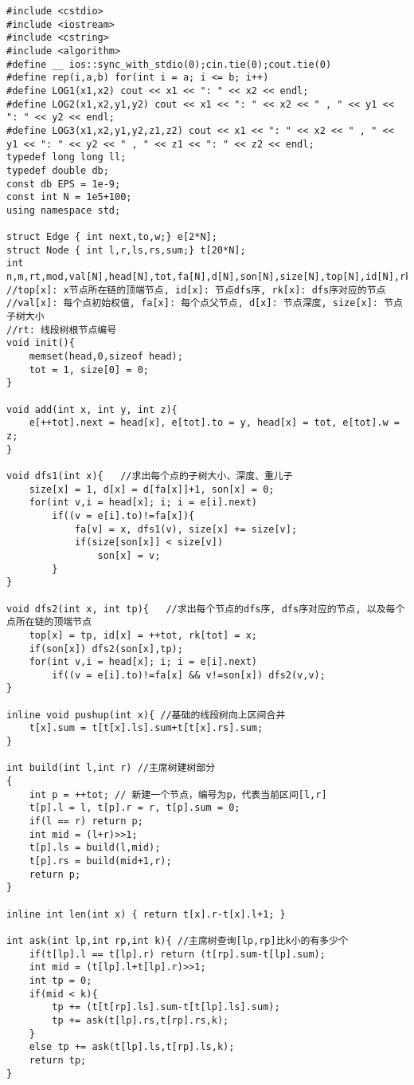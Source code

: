 \documentclass[twoside]{article}
\begin{document}
\begin{lstlisting}
#include <cstdio>
#include <iostream>
#include <cstring>
#include <algorithm>
#define __ ios::sync_with_stdio(0);cin.tie(0);cout.tie(0)
#define rep(i,a,b) for(int i = a; i <= b; i++)
#define LOG1(x1,x2) cout << x1 << ": " << x2 << endl;
#define LOG2(x1,x2,y1,y2) cout << x1 << ": " << x2 << " , " << y1 << ": " << y2 << endl;
#define LOG3(x1,x2,y1,y2,z1,z2) cout << x1 << ": " << x2 << " , " << y1 << ": " << y2 << " , " << z1 << ": " << z2 << endl;
typedef long long ll;
typedef double db;
const db EPS = 1e-9;
const int N = 1e5+100;
using namespace std;

struct Edge { int next,to,w;} e[2*N];
struct Node { int l,r,ls,rs,sum;} t[20*N];
int n,m,rt,mod,val[N],head[N],tot,fa[N],d[N],son[N],size[N],top[N],id[N],rk[N],root[N],rot;
//top[x]: x节点所在链的顶端节点, id[x]: 节点dfs序, rk[x]: dfs序对应的节点
//val[x]: 每个点初始权值, fa[x]: 每个点父节点, d[x]: 节点深度, size[x]: 节点子树大小
//rt: 线段树根节点编号
void init(){
	memset(head,0,sizeof head);
	tot = 1, size[0] = 0;
}

void add(int x, int y, int z){
	e[++tot].next = head[x], e[tot].to = y, head[x] = tot, e[tot].w = z;
}

void dfs1(int x){	//求出每个点的子树大小、深度、重儿子
	size[x] = 1, d[x] = d[fa[x]]+1, son[x] = 0;
	for(int v,i = head[x]; i; i = e[i].next)
		if((v = e[i].to)!=fa[x]){
			fa[v] = x, dfs1(v), size[x] += size[v];
			if(size[son[x]] < size[v])
				son[x] = v;
		}
}

void dfs2(int x, int tp){	//求出每个节点的dfs序, dfs序对应的节点, 以及每个点所在链的顶端节点
	top[x] = tp, id[x] = ++tot, rk[tot] = x;
	if(son[x]) dfs2(son[x],tp);
	for(int v,i = head[x]; i; i = e[i].next)
		if((v = e[i].to)!=fa[x] && v!=son[x]) dfs2(v,v);
}

inline void pushup(int x){ //基础的线段树向上区间合并
	t[x].sum = t[t[x].ls].sum+t[t[x].rs].sum;
}

int build(int l,int r) //主席树建树部分
{
	int p = ++tot; // 新建一个节点，编号为p，代表当前区间[l,r]
	t[p].l = l, t[p].r = r, t[p].sum = 0;
	if(l == r) return p;
	int mid = (l+r)>>1;
	t[p].ls = build(l,mid);
	t[p].rs = build(mid+1,r);
	return p;
}

inline int len(int x) { return t[x].r-t[x].l+1; }

int ask(int lp,int rp,int k){ //主席树查询[lp,rp]比k小的有多少个
	if(t[lp].l == t[lp].r) return (t[rp].sum-t[lp].sum);
	int mid = (t[lp].l+t[lp].r)>>1;
	int tp = 0;
	if(mid < k){
		tp += (t[t[rp].ls].sum-t[t[lp].ls].sum);
		tp += ask(t[lp].rs,t[rp].rs,k);
	} 
	else tp += ask(t[lp].ls,t[rp].ls,k);
	return tp;
}


\end{lstlisting}
\end{document}
